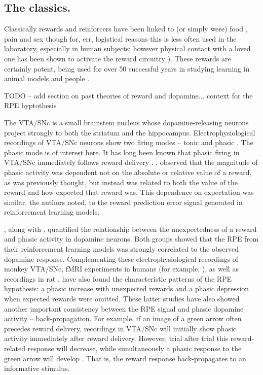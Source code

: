 \documentclass[doc,12pt]{apa}        %
\begin{document}
\subsection{The classics.} %
\label{sub:the_classics}
Classically rewards and reinforcers have been linked to (or simply were) food \cite{ODoherty:2006p2875}, pain \cite{Becerra:2011p7581,schultz:2007aa} and sex though for, err, logistical reasons this is less often used in the laboratory, especially in human subjects; however physical contact with a loved one has been shown to activate the reward circuitry \cite{Izuma:2008p2822,Fliessbach:2007gf}).  These rewards are certainly potent, being used for over 50 successful years in studying learning in animal models \cite{iversen:2007aa} and people \cite{Kim:2010p7248,Montague:2006mz}.  

TODO -- add section on past theories of reward and dopamine... context for the RPE hyptothesis


The VTA/SNc is a small brainstem nucleus whose dopamine-releasing neurons project strongly to both the striatum and the hippocampus.  Electrophysiological recordings of VTA/SNc neurons show two firing modes -- tonic and phasic \cite{DawNW:2006p6343}.  The phasic mode is of interest here.  It has long been known that phasic firing in VTA/SNc immediately follows reward delivery \cite{iversen:2007aa}. , observed that the magnitude of phasic activity was dependent not on the absolute or relative value of a reward, as was previously thought, but instead was related to both the value of the reward and how expected that reward was.  This dependence on expectation was similar, the authors noted, to the reward prediction error signal generated in reinforcement learning models.  

, along with , quantified the relationship between the unexpectedness of a reward and phasic activity in dopamine neurons.  Both groups showed that the RPE from their reinforcement learning models was strongly correlated to the observed dopamine response.  Complementing these electrophysiological recordings of monkey VTA/SNc, fMRI experiments in humans (for example, ), as well as recordings in rat \cite{Roesch:2007p2519}, have also found the characteristic patterns of the RPE hypothesis: a phasic increase with unexpected rewards and a phasic depression when expected rewards were omitted.  These latter studies have also showed another important consistency between the RPE signal and phasic dopamine activity -- back-propagation.  For example, if an image of a green arrow often precedes reward delivery, recordings in VTA/SNc will initially show phasic activity immediately after reward delivery.  However, trial after trial this reward-related response will decrease, while simultaneously a phasic response to the green arrow will develop \cite{Roesch:2007p2519}.  That is, the reward response back-propagates to an informative stimulus. 
\end{document}
